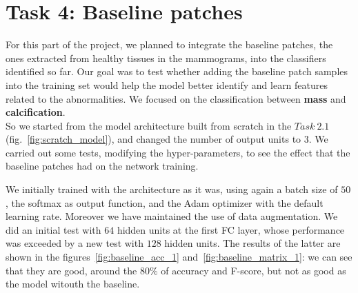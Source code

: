 \documentclass[11pt,a4paper,oneside]{article}
\begin{document}
\clearpage

\section{Task 4: Baseline patches}
For this part of the project, we planned to integrate the baseline patches, the ones extracted from healthy tissues in the mammograms, into the classifiers identified so far. Our goal was to test whether adding the baseline patch samples into the training set would help the model better identify and learn features related to the abnormalities.
We focused on the classification between \textbf{mass} and \textbf{calcification}. \\
So we started from the model architecture built from scratch in the $Task\ 2.1$ (fig.~\ref{fig:scratch_model}), and changed the number of output units to $3$. We carried out some tests, modifying the hyper-parameters, to see the effect that the baseline patches had on the network training.

We initially trained with the architecture as it was, using again a batch size of $50$, the softmax as output function, and the Adam optimizer with the default learning rate. Moreover we have maintained the use of data augmentation. We did an initial test with $64$ hidden units at the first FC layer, whose performance was exceeded by a new test with $128$ hidden units. The results of the latter are shown in the figures~\ref{fig:baseline_acc_1} and~\ref{fig:baseline_matrix_1}: we can see that they are good, around the $80\%$ of accuracy and F-score, but not as good as the model witouth the baseline. 
\end{document}
